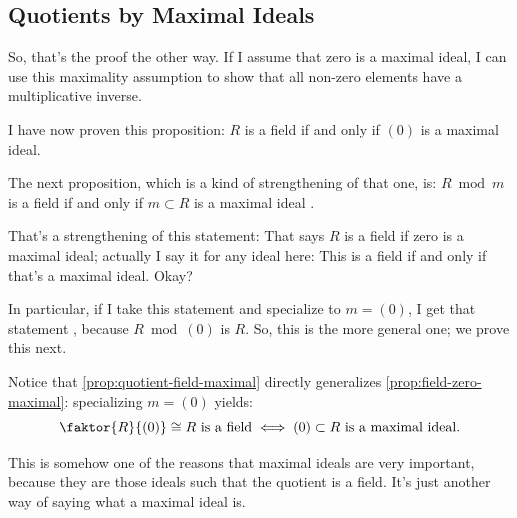 \subsection{Quotients by Maximal Ideals}

\begin{speech}[00:20:21 - 00:21:28]
So, that's the proof the other way. If I assume that zero is a maximal ideal, I can use this maximality assumption to show that all non-zero elements have a multiplicative inverse.

I have now proven this proposition: $R$ is a field if and only if $(0)$ is a maximal ideal.

The next proposition, which is a kind of strengthening of that one, is: $R \bmod m$ is a field if and only if $m \subset R$ is a maximal ideal .

That's a strengthening of this statement: That says $R$ is a field if zero is a maximal ideal; actually I say it for any ideal here: This is a field if and only if that's a maximal ideal. Okay?

In particular, if I take this statement and specialize to $m = (0)$, I get that statement , because $R \bmod (0)$ is $R$. So, this is the more general one; we prove this next.
\end{speech}

\begin{content}

\begin{steps}[Specialization to $m = (0)$]
Notice that \cref{prop:quotient-field-maximal} directly generalizes \cref{prop:field-zero-maximal}: specializing $m = (0)$ yields:
\[
\faktor{R}{(0)} \cong R \text{ is a field} \iff (0) \subset R \text{ is a maximal ideal}.
\]
\end{steps}
\end{content}

\begin{speech}[00:21:28 - 00:21:49]
This is somehow one of the reasons that maximal ideals are very important, because they are those ideals such that the quotient is a field. It's just another way of saying what a maximal ideal is.
\end{speech}

